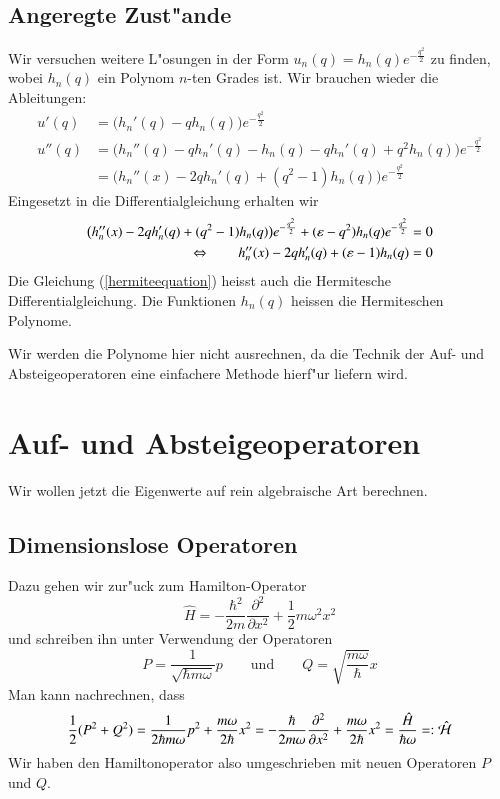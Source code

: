 \subsection{Angeregte Zust"ande}
Wir versuchen weitere L"osungen in der Form $u_n(q)=h_n(q)e^{-\frac{q^2}2}$
zu finden, wobei $h_n(q)$ ein Polynom $n$-ten Grades ist.
Wir brauchen wieder die Ableitungen:
\begin{align*}
u'(q)
&=
\bigl(h_n'(q)- qh_n(q)\bigr)e^{-\frac{q^2}2}
\\
u''(q)
&=
\bigl(
h_n''(q)- qh_n'(q)
- h_n(q)
- q h_n'(q)
+q^2h_n(q)
\bigr)e^{-\frac{q^2}2}
\\
&=
\bigl(
h_n''(x)-2 qh_n'(q)
+(q^2-1)h_n(q)
\bigr)e^{-\frac{q^2}2}
\end{align*}
Eingesetzt in die Differentialgleichung erhalten wir
\begin{align}
\bigl(
h_n''(x)-2 qh_n'(q)
+(q^2-1)h_n(q)
\bigr)e^{-\frac{q^2}2}
+(\varepsilon-q^2)h_n(q)e^{-\frac{q^2}2}&=0
\notag
\\
\Leftrightarrow\qquad
h_n''(x)-2 qh_n'(q)
+(\varepsilon - 1)h_n(q)&=0
\label{hermiteequation}
\end{align}
Die Gleichung (\ref{hermiteequation}) heisst auch die 
Hermitesche Differentialgleichung.
Die Funktionen $h_n(q)$ heissen die Hermiteschen Polynome.

Wir werden die Polynome hier nicht ausrechnen, da die Technik der
Auf- und Absteigeoperatoren eine einfachere Methode hierf"ur liefern
wird.

\section{Auf- und Absteigeoperatoren}
Wir wollen jetzt die Eigenwerte auf rein algebraische Art berechnen.
\subsection{Dimensionslose Operatoren}
Dazu gehen wir zur"uck zum Hamilton-Operator
\[
\hat H=-\frac{\hbar^2}{2m}\frac{\partial^2}{\partial x^2}
+\frac12m\omega^2 x^2
\]
und schreiben ihn unter Verwendung der Operatoren
\[
P=\frac{1}{\sqrt{\hbar m\omega}}p 
\qquad
\text{und}
\qquad
Q=\sqrt{\frac{m\omega}{\hbar}}x
\]
Man kann nachrechnen, dass 
\[
\frac12(P^2+Q^2)
=
\frac{1}{2\hbar m \omega}p^2
+
\frac{m\omega}{2\hbar}x^2
=
-\frac{\hbar}{2 m \omega}\frac{\partial^2}{\partial x^2}
+
\frac{m\omega}{2\hbar}x^2
=\frac{\hat H}{\hbar\omega}
=:\hat{\cal H}
\]
Wir haben den Hamiltonoperator also umgeschrieben mit neuen Operatoren 
$P$ und $Q$.

